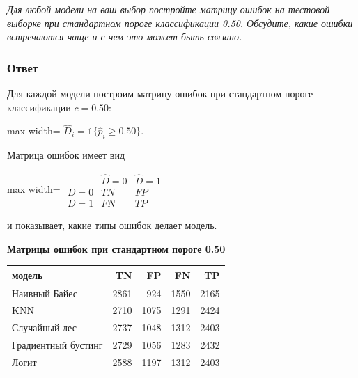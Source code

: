 \documentclass[11pt]{article}
\newcounter{none}
\newenvironment{tasktext}
      {\begin{tcolorbox}[breakable, colback=black!3, colframe=black!28,
        boxrule=0.4pt, arc=1.5mm, left=7pt, right=7pt, top=5pt, bottom=5pt,
        before skip=0.35em, after skip=0.75em]\itshape}
      {\end{tcolorbox}}
\begin{document}
\begin{tasktext}
Для любой модели на ваш выбор постройте матрицу ошибок на тестовой
выборке при стандартном пороге классификации 0.50. Обсудите, какие
ошибки встречаются чаще и с чем это может быть связано.
\end{tasktext}

\subsubsection{Ответ}

Для каждой модели построим матрицу ошибок при стандартном пороге
классификации \(c=0.50\):

\begin{center}
\begin{adjustbox}{max width=\linewidth}
\(\displaystyle \hat D_i = \mathbb{1}\{\hat p_i \ge 0.50\}.\)
\end{adjustbox}
\end{center}

Матрица ошибок имеет вид

\begin{center}
\begin{adjustbox}{max width=\linewidth}
\(\displaystyle 
\begin{array}{c|cc}
 & \hat D=0 & \hat D=1 \\
\hline
D=0 & TN & FP \\
D=1 & FN & TP
\end{array}
\)
\end{adjustbox}
\end{center}

и показывает, какие типы ошибок делает модель.

    \textbf{Матрицы ошибок при стандартном пороге 0.50}

{\def\LTcaptype{none} %
\begin{longtable}[]{@{}lrrrr@{}}
\toprule\noalign{}
модель & TN & FP & FN & TP \\
\midrule\noalign{}
\endhead
\bottomrule\noalign{}
\endlastfoot
Наивный Байес & 2861 & 924 & 1550 & 2165 \\
KNN & 2710 & 1075 & 1291 & 2424 \\
Случайный лес & 2737 & 1048 & 1312 & 2403 \\
Градиентный бустинг & 2729 & 1056 & 1283 & 2432 \\
Логит & 2588 & 1197 & 1312 & 2403 \\
\end{longtable}
}
\end{document}
